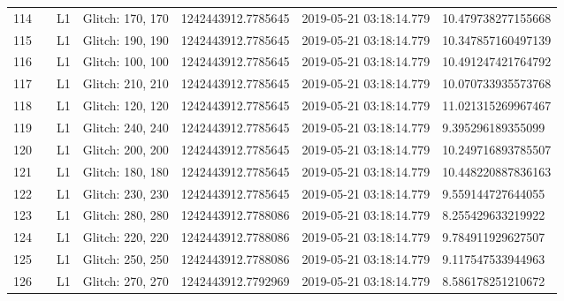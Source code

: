 \begin{longtable}{lllllll}
114  &                                                    &       L1 &  Glitch: 170, 170 &  1242443912.7785645 &  2019-05-21 03:18:14.779 &  10.479738277155668 \\
115  &                                                    &       L1 &  Glitch: 190, 190 &  1242443912.7785645 &  2019-05-21 03:18:14.779 &  10.347857160497139 \\
116  &                                                    &       L1 &  Glitch: 100, 100 &  1242443912.7785645 &  2019-05-21 03:18:14.779 &  10.491247421764792 \\
117  &                                                    &       L1 &  Glitch: 210, 210 &  1242443912.7785645 &  2019-05-21 03:18:14.779 &  10.070733935573768 \\
118  &                                                    &       L1 &  Glitch: 120, 120 &  1242443912.7785645 &  2019-05-21 03:18:14.779 &  11.021315269967467 \\
119  &                                                    &       L1 &  Glitch: 240, 240 &  1242443912.7785645 &  2019-05-21 03:18:14.779 &   9.395296189355099 \\
120  &                                                    &       L1 &  Glitch: 200, 200 &  1242443912.7785645 &  2019-05-21 03:18:14.779 &  10.249716893785507 \\
121  &                                                    &       L1 &  Glitch: 180, 180 &  1242443912.7785645 &  2019-05-21 03:18:14.779 &  10.448220887836163 \\
122  &                                                    &       L1 &  Glitch: 230, 230 &  1242443912.7785645 &  2019-05-21 03:18:14.779 &   9.559144727644055 \\
123  &                                                    &       L1 &  Glitch: 280, 280 &  1242443912.7788086 &  2019-05-21 03:18:14.779 &   8.255429633219922 \\
124  &                                                    &       L1 &  Glitch: 220, 220 &  1242443912.7788086 &  2019-05-21 03:18:14.779 &   9.784911929627507 \\
125  &                                                    &       L1 &  Glitch: 250, 250 &  1242443912.7788086 &  2019-05-21 03:18:14.779 &   9.117547533944963 \\
126  &                                                    &       L1 &  Glitch: 270, 270 &  1242443912.7792969 &  2019-05-21 03:18:14.779 &   8.586178251210672 \\

\end{longtable}
